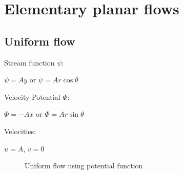\section{Elementary planar flows}

\subsection{Uniform flow}

Stream function $\psi$:

$\psi = A y$ or $\psi = Ar \cos\theta$

Velocity Potential $\Phi$:

$\Phi = -A x$ or $\Phi = Ar \sin\theta$

Velocities:

$ u = A$, $v=0$

\begin{figure}[h]
\begin{center}
\end{center}
\caption{Uniform flow using potential function}
\label{planaruniformflow}
\end{figure}




